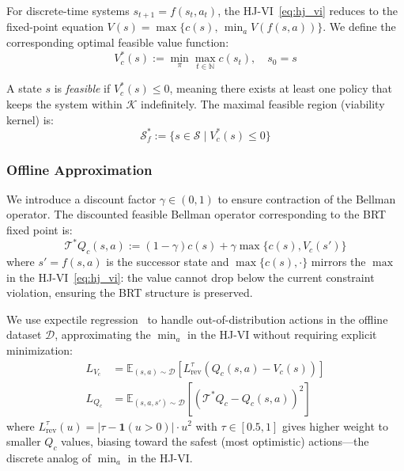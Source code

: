 \documentclass[letterpaper, 10 pt, conference]{ieeeconf}
\begin{document}
For discrete-time systems $s_{t+1} = f(s_t, a_t)$, the HJ-VI~\eqref{eq:hj_vi} reduces to the fixed-point equation $V(s) = \max\{c(s),\, \min_a V(f(s,a))\}$. We define the corresponding optimal feasible value function:
\begin{equation}
    V^*_c(s) := \min_{\pi} \max_{t \in \mathbb{N}} c(s_t), \quad s_0 = s
    \label{eq:value_c}
\end{equation}

A state $s$ is \emph{feasible} if $V^*_c(s) \leq 0$, meaning there exists at least one policy that keeps the system within $\mathcal{K}$ indefinitely. The maximal feasible region (viability kernel) is:
\begin{equation}
    \mathcal{S}^*_f := \{s \in \mathcal{S} \mid V^*_c(s) \leq 0\}
\end{equation}

\subsubsection{Offline Approximation}

We introduce a discount factor $\gamma \in (0, 1)$ to ensure contraction of the Bellman operator. The discounted feasible Bellman operator corresponding to the BRT fixed point is:
\begin{equation}
    \mathcal{T}^* Q_c(s, a) \!:=\! (1{-}\gamma) c(s) + \gamma \max\{c(s), V_c(s')\}
    \label{eq:bellman}
\end{equation}
where $s' = f(s,a)$ is the successor state and $\max\{c(s), \cdot\}$ mirrors the $\max$ in the HJ-VI~\eqref{eq:hj_vi}: the value cannot drop below the current constraint violation, ensuring the BRT structure is preserved.

We use expectile regression~\cite{kostrikov2022iql} to handle out-of-distribution actions in the offline dataset $\mathcal{D}$, approximating the $\min_a$ in the HJ-VI without requiring explicit minimization:
\begin{align}
    L_{V_c} &= \mathbb{E}_{(s,a) \sim \mathcal{D}} \left[ L^\tau_{\text{rev}}(Q_c(s,a) - V_c(s)) \right] \label{eq:loss_v} \\
    L_{Q_c} &= \mathbb{E}_{(s,a,s') \sim \mathcal{D}} \left[ (\mathcal{T}^* Q_c - Q_c(s,a))^2 \right] \label{eq:loss_q}
\end{align}
where $L^\tau_{\text{rev}}(u) = |\tau - \mathbf{1}(u > 0)| \cdot u^2$ with $\tau \in [0.5, 1]$ gives higher weight to smaller $Q_c$ values, biasing toward the safest (most optimistic) actions---the discrete analog of $\min_a$ in the HJ-VI.
\end{document}
